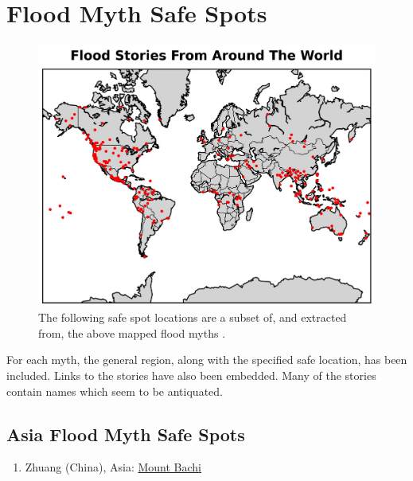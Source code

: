 \documentclass[10pt,twocolumn,letterpaper]{article}
\begin{document}
\clearpage
\twocolumn

\section{Flood Myth Safe Spots}

\begin{figure}[H]
\begin{center}
   \includegraphics[width=1\linewidth]{flood.jpg}
\end{center}
   \caption{The following safe spot locations are a subset of, and extracted from, the above mapped flood myths \cite{2,17}.}
\label{fig:21}
\label{fig:onecol}
\end{figure}

For each myth, the general region, along with the specified safe location, has been included. Links to the stories have also been embedded. Many of the stories contain names which seem to be antiquated.

\subsection{Asia Flood Myth Safe Spots}

\begin{flushleft}
\begin{enumerate}
\item Zhuang (China), Asia: \href{http://www.talkorigins.org/faqs/flood-myths.html#Zhuang}{Mount Bachi}
\end{enumerate}
\end{flushleft}
\end{document}

